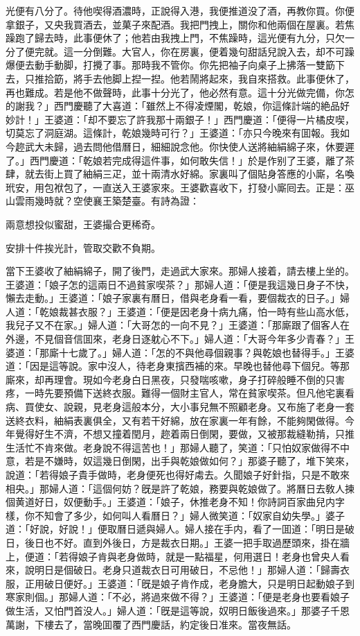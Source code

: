 光便有八分了。待他喫得酒濃時，正說得入港，我便推道没了酒，再教你買。你便拿銀子，又央我買酒去，並菓子來配酒。我把門拽上，關你和他兩個在屋裏。若焦躁跑了歸去時，此事便休了；他若由我拽上門，不焦躁時，這光便有九分，只欠一分了便完就。這一分倒難。大官人，你在房裏，便着幾句甜話兒說入去，却不可躁爆便去動手動脚，打攪了事。那時我不管你。你先把袖子向桌子上拂落一雙筯下去，只推拾筯，將手去他脚上揑一揑。他若鬧將起來，我自來搭救。此事便休了，再也難成。若是他不做聲時，此事十分光了，他必然有意。這十分光做完備，你怎的謝我？」西門慶聽了大喜道：「雖然上不得凌煙閣，乾娘，你這條計端的絶品好妙計！」王婆道：「却不要忘了許我那十兩銀子！」西門慶道：「便得一片橘皮喫，切莫忘了洞庭湖。這條計，乾娘幾時可行？」王婆道：「亦只今晚來有囬報。我如今趂武大未歸，過去問他借曆日，細細說念他。你快使人送將紬絹綿子來，休要遲了。」西門慶道：「乾娘若完成得這件事，如何敢失信！」於是作别了王婆，離了茶肆，就去街上買了紬絹三疋，並十兩清水好綿。家裏叫了個貼身答應的小廝，名喚玳安，用包袱包了，一直送入王婆家來。王婆歡喜收下，打發小廝囘去。正是：巫山雲雨幾時就？空使襄王築楚臺。有詩為證：

\begin{myquote}
兩意想投似蜜甜，王婆撮合更稀奇。

安排十件挨光計，管取交歡不負期。
\end{myquote}

當下王婆收了紬絹綿子，開了後門，走過武大家來。那婦人接着，請去樓上坐的。王婆道：「娘子怎的這兩日不過貧家喫茶？」那婦人道：「便是我這幾日身子不快，懶去走動。」王婆道：「娘子家裏有曆日，借與老身看一看，要個裁衣的日子。」婦人道：「乾娘裁甚衣服？」王婆道：「便是因老身十病九痛，怕一時有些山高水低，我兒子又不在家。」婦人道：「大哥怎的一向不見？」王婆道：「那廝跟了個客人在外邊，不見個音信囬來，老身日逐躭心不下。」婦人道：「大哥今年多少青春？」王婆道：「那廝十七歲了。」婦人道：「怎的不與他尋個親事？與乾娘也替得手。」王婆道：「因是這等說。家中沒人，待老身東擯西補的來。早晚也替他尋下個兒。等那廝來，却再理會。現如今老身白日黑夜，只發喘咳嗽，身子打碎般睡不倒的只害疼，一時先要預備下送終衣服。難得一個財主官人，常在貧家喫茶。但凡他宅裏看病、買使女、說親，見老身這般本分，大小事兒無不照顧老身。又布施了老身一套送終衣料，紬絹表裏俱全，又有若干好綿，放在家裏一年有餘，不能夠閑做得。今年覺得好生不濟，不想又撞着閏月，趂着兩日倒閑，要做，又被那裁縫勒掯，只推生活忙不肯來做。老身說不得這苦也！」那婦人聽了，笑道：「只怕奴家做得不中意，若是不嫌時，奴這幾日倒閑，出手與乾娘做如何？」那婆子聽了，堆下笑來，說道：「若得娘子貴手做時，老身便死也得好䖏去。久聞娘子好針指，只是不敢來相央。」那婦人道：「這個何妨？旣是許了乾娘，務要與乾娘做了。將曆日去敎人揀個黄道好日，奴便動手。」王婆道：「娘子，休推老身不知！你詩詞百家曲兒内字樣，你不知會了多少，如何叫人看曆日？」婦人微笑道：「奴家自幼失學。」婆子道：「好說，好說！」便取曆日遞與婦人。婦人接在手内，看了一囬道：「明日是破日，後日也不好。直到外後日，方是裁衣日期。」王婆一把手取過歷頭來，掛在牆上，便道：「若得娘子肯與老身做時，就是一點福星，何用選日！老身也曾央人看來，說明日是個破日。老身只道裁衣日可用破日，不忌他！」那婦人道：「歸壽衣服，正用破日便好。」王婆道：「旣是娘子肯作成，老身膽大，只是明日起動娘子到寒家則個。」那婦人道：「不必，將過來做不得？」王婆道：「便是老身也要看娘子做生活，又怕門首没人。」婦人道：「旣是這等說，奴明日飯後過來。」那婆子千恩萬謝，下樓去了，當晚囬覆了西門慶話，約定後日准來。當夜無話。


